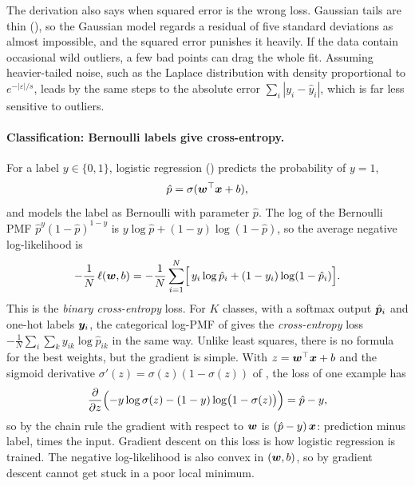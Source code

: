 The derivation also says when squared error is the wrong loss. Gaussian
tails are thin (), so the Gaussian model regards
a residual of five standard deviations as almost impossible, and the
squared error punishes it heavily. If the data contain occasional wild
outliers, a few bad points can drag the whole fit. Assuming
heavier-tailed noise, such as the Laplace distribution with density
proportional to $e^{-|\varepsilon|/s}$, leads by the same steps to the
absolute error $\sum_i |y_i - \hat{y}_i|$, which is far less sensitive
to outliers.

\paragraph{Classification: Bernoulli labels give cross-entropy.}
For a label $y \in \{0, 1\}$, logistic regression
() predicts the probability of $y = 1$,
\[
  \hat{p} = \sigma(\bm{w}^\top\bm{x} + b),
\]
and models the label as Bernoulli with parameter $\hat{p}$. The log of
the Bernoulli PMF $\hat{p}^{y}(1 - \hat{p})^{1 - y}$ is $y \log\hat{p} +
(1 - y)\log(1 - \hat{p})$, so the average negative log-likelihood is
\[
  -\frac{1}{N}\,\ell(\bm{w}, b)
  = -\frac{1}{N}\sum_{i=1}^{N}
    \Bigl[\, y_i \log\hat{p}_i + (1 - y_i)\log(1 - \hat{p}_i) \Bigr] .
\]
This is the \emph{binary cross-entropy} loss. For $K$ classes, with a
softmax output $\hat{\bm{p}}_i$ and one-hot labels $\bm{y}_i$, the
categorical log-PMF of  gives the
\emph{cross-entropy} loss $-\frac1N\sum_i\sum_k y_{ik}\log\hat{p}_{ik}$ in
the same way. Unlike least squares, there is no formula for the best
weights, but the gradient is simple. With $z = \bm{w}^\top\bm{x} +
b$ and the sigmoid derivative $\sigma'(z) = \sigma(z)(1 - \sigma(z))$ of
, the loss of one example has
\[
  \frac{\partial}{\partial z}
  \Bigl(-y\log\sigma(z) - (1 - y)\log\bigl(1 - \sigma(z)\bigr)\Bigr)
  = \hat{p} - y ,
\]
so by the chain rule the gradient with respect to $\bm{w}$ is
$(\hat{p} - y)\,\bm{x}$: prediction minus label, times the input.
Gradient descent on this loss is how logistic regression is trained.
The negative log-likelihood is also convex in $(\bm{w}, b)$, so by
 gradient descent cannot get stuck in a
poor local minimum.

